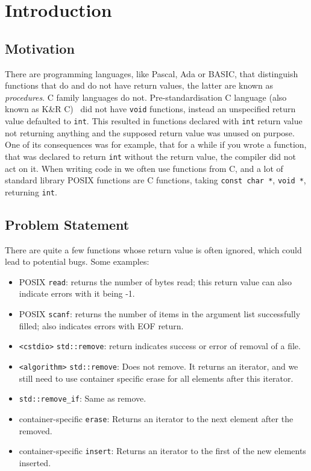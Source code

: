 
\chapter{Introduction}
\label{ch:intro}

\section{Motivation}

There are programming languages, like Pascal, Ada or BASIC, that distinguish functions that do and do not
have return values,
the latter are known as \emph{procedures}. C family languages do not. Pre-standardisation C language (also known as K\&R C)~\cite{kandr}
did not have \lstinline{void} functions,
instead an unspecified return value defaulted to \lstinline{int}. This resulted in functions declared with \lstinline{int} return value
not returning anything and the supposed return value was unused on purpose. One of its consequences was for example, that for a while if
you wrote a function, that was declared to return \lstinline{int} without the return value, the compiler did not act on it. When writing
code in \CC{} we often use functions from C, and a lot of standard library POSIX functions are C functions, taking \lstinline{const char *},
\lstinline{void *}, returning \lstinline{int}.

\section{Problem Statement}
\label{sec:prob-state}

There are quite a few functions whose return value is often ignored, which could lead to potential bugs. Some examples:

\begin{itemize}
	\item POSIX \texttt{read}: returns the number of bytes read; this return value can also indicate errors with it being -1.
	\item POSIX \texttt{scanf}: returns the number of items in the argument list successfully filled; also indicates errors with EOF return.
	\item \texttt{<cstdio>} \texttt{std::remove}: return indicates success or error of removal of a file.
    \item \texttt{<algorithm>} \texttt{std::remove}: Does not remove. It returns an iterator, and we still need to use container specific erase
    for all elements after this iterator.
	\item \texttt{std::remove\_if}: Same as remove.
	\item container-specific \texttt{erase}: Returns an iterator to the next element after the removed. 
	\item container-specific \texttt{insert}: Returns an iterator to the first of the new elements inserted.
\end{itemize}

